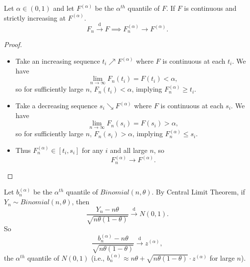 \documentclass[a4paper]{article}
\begin{document}
\begin{prop}
	Let $\alpha \in (0,1)$ and let $F^{(\alpha)}$ be the $\alpha^{th}$ quantile of $F$. If $F$ is continuous and strictly increasing at $F^{(\alpha)}$.
	\begin{equation}
		F_n \stackrel{\text{d}}{\longrightarrow} F \implies F_n^{(\alpha)} \to F^{(\alpha)}.
	\end{equation}
\end{prop}

\begin{proof}
	\quad 
	\begin{itemize}
		\item Take an increasing sequence $t_i \nearrow F^{(\alpha)}$ where $F$ is continuous at each $t_i$. We have
		\begin{equation*}
			\lim\limits_{n \to \infty} F_n(t_i) = F(t_i) < \alpha,
		\end{equation*}
		so for sufficiently large $n$, $F_n(t_i) < \alpha$, implying $F_n^{(\alpha)} \geq t_i$.
		\item Take a decreasing sequence $s_i \searrow F^{(\alpha)}$ where $F$ is continuous at each $s_i$. We have
		\begin{equation*}
			\lim\limits_{n \to \infty} F_n(s_i) = F(s_i) > \alpha,
		\end{equation*}
		so for sufficiently large $n$, $F_n(s_i) > \alpha$, implying $F_n^{(\alpha)} \leq s_i$.
		\item Thus $F_n^{(\alpha)} \in [t_i,s_i]$ for any $i$ and all large $n$, so
		\begin{equation}
			F_n^{(\alpha)} \to F^{(\alpha)}.
		\end{equation}
	\end{itemize}
\end{proof}

\begin{eg}
	Let $b_n^{(\alpha)}$ be the $\alpha^{th}$ quantile of $Binomial(n,\theta)$. By Central Limit Theorem, if $Y_n \sim Binomial(n,\theta)$, then
	\begin{equation}
		\frac{Y_n - n\theta}{\sqrt{n\theta(1-\theta)}} \stackrel{\text{d}}{\longrightarrow} N(0,1).
	\end{equation}
	So
	\begin{equation}
		\frac{b_n^{(\alpha)} - n\theta}{\sqrt{n\theta(1-\theta)}} \stackrel{\text{d}}{\longrightarrow} z^{(\alpha)},
	\end{equation}
	the $\alpha^{th}$ quantile of $N(0,1)$ (i.e., $b_n^{(\alpha)} \approx n \theta + \sqrt{n\theta(1-\theta)} \cdot z^{(\alpha)}$ for large $n$).
\end{eg}
\end{document}
